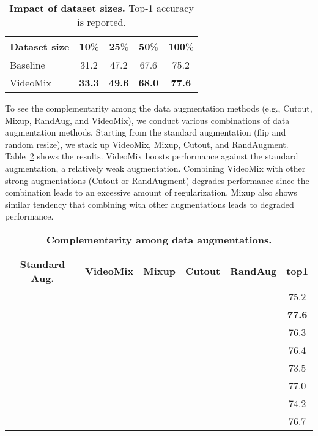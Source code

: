\begin{table}[h]
\centering
\begin{tabular}{@{}lcccc@{}}
\toprule
Dataset size &	10$\%$	& 25$\%$	& 50$\%$	& 100$\%$ \\ \midrule
Baseline	& 31.2 &	47.2	& 67.6 & 	75.2 \\
VideoMix	& \textbf{33.3}	& \textbf{49.6}	& \textbf{68.0}	& \textbf{77.6} \\ \midrule 
\end{tabular}
\caption{\textbf{Impact of dataset sizes.} Top-1 accuracy is reported.}
\label{ablation:datasize}
\end{table}


To see the complementarity among the data augmentation methods (e.g., Cutout, Mixup, RandAug, and VideoMix), we conduct various combinations of data augmentation methods.
Starting from the standard augmentation (flip and random resize), we stack up VideoMix, Mixup, Cutout, and RandAugment.
Table~\ref{ablation:adding} shows the results. 
VideoMix boosts performance against the standard augmentation, a relatively weak augmentation. 
Combining VideoMix with other strong augmentations (Cutout or RandAugment) degrades performance since the combination leads to an excessive amount of regularization.
Mixup also shows similar tendency that combining with other augmentations leads to degraded performance. 

\begin{table}[h]
\tabcolsep=0.05cm
\centering
\begin{tabular}{@{}cccccc@{}}
\toprule
Standard Aug. &	VideoMix	& Mixup & Cutout	& RandAug	& top1  \\ \midrule
\checkmark	& & & &	&		75.2 \\
\checkmark	& \checkmark & &	& &		\textbf{77.6} \\
\checkmark	& \checkmark & & \checkmark & &		76.3 \\
\checkmark	& \checkmark & &	& \checkmark &	76.4 \\ 
\checkmark	& \checkmark & & \checkmark & \checkmark &	73.5 \\
\checkmark	& & \checkmark &  &	&	77.0 \\
\checkmark	& & \checkmark & \checkmark &	&	74.2 \\
\checkmark	& & \checkmark & \checkmark & \checkmark &	76.7  \\
 \midrule
\end{tabular}
\caption{\textbf{Complementarity among data augmentations.}}
\label{ablation:adding}
\end{table}